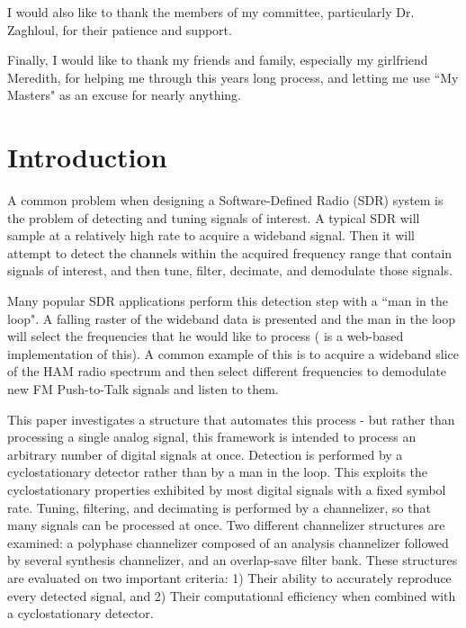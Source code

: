 \documentclass[12pt]{report}
\begin{document}
I would also like to thank the members of my committee, particularly Dr.
Zaghloul, for their patience and support.

Finally, I would like to thank my friends and family, especially my girlfriend
Meredith, for helping me through this years long process, and letting me use
``My Masters" as an excuse for nearly anything.

\tableofcontents
\pagebreak

\listoffigures
\pagebreak


\pagestyle{myheadings}

\chapter{Introduction}
\label{sec:intro}

A common problem when designing a Software-Defined Radio (SDR) system is the
problem of detecting and tuning signals of interest. A typical SDR will sample
at a relatively high rate to acquire a wideband signal. Then it will attempt to
detect the channels within the acquired frequency range that contain signals of
interest, and then tune, filter, decimate, and demodulate those signals. 

Many popular SDR applications perform this detection step with a ``man in the
loop".  A falling raster of the wideband data is presented and the man in the
loop will select  the frequencies that he would like to process (\cite{WebSDR}
is a web-based implementation of this).  A common example of this is to acquire
a wideband slice of the HAM radio spectrum and then select different
frequencies to demodulate new FM Push-to-Talk signals and listen to them.

This paper investigates a structure that automates this process - but rather
than processing a single analog signal, this framework is intended to process
an arbitrary number of digital signals at once. Detection is performed by
a cyclostationary detector rather than by a man in the loop. This exploits the
cyclostationary properties exhibited by most digital signals with a fixed
symbol rate.  Tuning, filtering, and decimating is performed by a channelizer,
so that many signals can be processed at once.  Two different channelizer
structures are examined: a polyphase channelizer composed of an analysis
channelizer followed by several synthesis channelizer, and an overlap-save
filter bank. These structures are evaluated on two important criteria:
1) Their ability to accurately reproduce every detected signal, and 2) Their
computational efficiency when combined with a cyclostationary detector.
\end{document}
